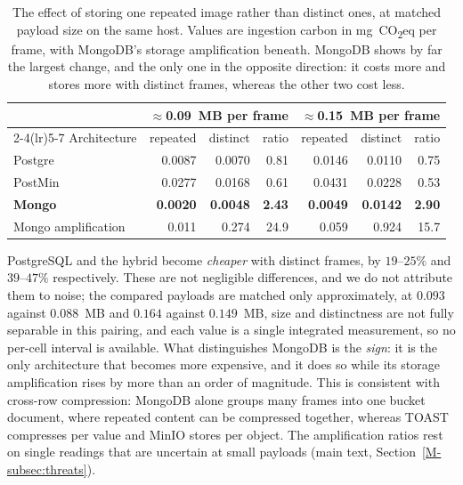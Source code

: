 \documentclass[11pt]{article}
\begin{document}
\begin{table}[htbp]
\centering
\caption{The effect of storing one repeated image rather than distinct ones, at matched payload size on the same host. Values are ingestion carbon in mg~CO\textsubscript{2}eq per frame, with MongoDB's storage amplification beneath. MongoDB shows by far the largest change, and the only one in the opposite direction: it costs more and stores more with distinct frames, whereas the other two cost less.}\label{tab:repetition}
\small
\begin{tabular}{@{}lrrrrrr@{}}
\toprule
 & \multicolumn{3}{c}{$\approx$0.09~MB per frame} & \multicolumn{3}{c}{$\approx$0.15~MB per frame} \\
\cmidrule(lr){2-4}\cmidrule(lr){5-7}
Architecture & repeated & distinct & ratio & repeated & distinct & ratio \\
\midrule
Postgre & 0.0087 & 0.0070 & 0.81 & 0.0146 & 0.0110 & 0.75 \\
PostMin & 0.0277 & 0.0168 & 0.61 & 0.0431 & 0.0228 & 0.53 \\
\textbf{Mongo} & \textbf{0.0020} & \textbf{0.0048} & \textbf{2.43} & \textbf{0.0049} & \textbf{0.0142} & \textbf{2.90} \\
\midrule
Mongo amplification & 0.011 & 0.274 & 24.9 & 0.059 & 0.924 & 15.7 \\
\bottomrule
\end{tabular}

\smallskip
\parbox{0.92\linewidth}{\footnotesize PostgreSQL and the hybrid become \emph{cheaper} with distinct frames, by $19$--$25\%$ and $39$--$47\%$ respectively. These are not negligible differences, and we do not attribute them to noise; the compared payloads are matched only approximately, at $0.093$ against $0.088$~MB and $0.164$ against $0.149$~MB, size and distinctness are not fully separable in this pairing, and each value is a single integrated measurement, so no per-cell interval is available. What distinguishes MongoDB is the \emph{sign}: it is the only architecture that becomes more expensive, and it does so while its storage amplification rises by more than an order of magnitude. This is consistent with cross-row compression: MongoDB alone groups many frames into one bucket document, where repeated content can be compressed together, whereas TOAST compresses per value and MinIO stores per object. The amplification ratios rest on single readings that are uncertain at small payloads (main text, Section~\ref{M-subsec:threats}).}
\end{table}
\end{document}

